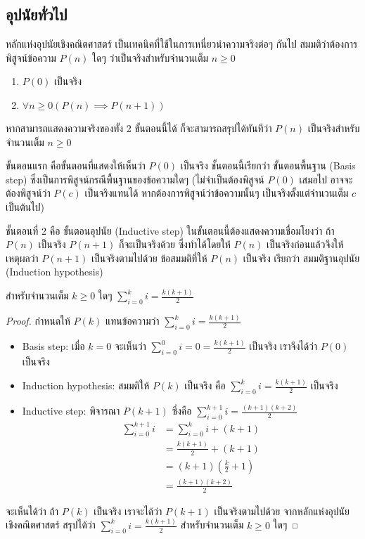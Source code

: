 \subsection{อุปนัยทั่วไป}

หลักแห่งอุปนัยเชิงคณิตศาสตร์ เป็นเทคนิคที่ใช้ในการเหนี่ยวนำความจริงต่อๆ กันไป สมมติว่าต้องการพิสูจน์ข้อความ $P(n)$ ใดๆ ว่าเป็นจริงสำหรับจำนวนเต็ม $n \geq 0$
\begin{enumerate}
\item $P(0)$ เป็นจริง
\item $\forall n \geq 0 (P(n) \implies P(n+1))$
\end{enumerate}

หากสามารถแสดงความจริงของทั้ง 2 ขั้นตอนนี้ได้ ก็จะสามารถสรุปได้ทันทีว่า $P(n)$ เป็นจริงสำหรับจำนวนเต็ม $n \geq 0$

ขั้นตอนแรก คือขั้นตอนที่แสดงให้เห็นว่า $P(0)$ เป็นจริง ชั้นตอนนี้เรียกว่า ขั้นตอนพื้นฐาน (Basis step) ซึ่งเป็นการพิสูจน์กรณีพื้นฐานของข้อความใดๆ (ไม่จำเป็นต้องพิสูจน์ $P(0)$ เสมอไป อาจจะต้องพิสูจน์ว่า $P(c)$ เป็นจริงแทนได้ หากต้องการพิสูจน์ว่าข้อความนั้นๆ เป็นจริงตั้งแต่จำนวนเต็ม $c$ เป็นต้นไป)

ชั้นตอนที่ 2 คือ ขั้นตอนอุปนัย (Inductive step) ในขั้นตอนนี้ต้องแสดงความเชื่อมโยงว่า ถ้า $P(n)$ เป็นจริง $P(n+1)$ ก็จะเป็นจริงด้วย ซึ่งทำได้โดยให้ $P(n)$ เป็นจริงก่อนแล้วจึงให้เหตุผลว่า $P(n+1)$ เป็นจริงตามไปด้วย ข้อสมมติที่ให้ $P(n)$  เป็นจริง เรียกว่า สมมติฐานอุปนัย (Induction hypothesis)

\begin{theorem}
สำหรับจำนวนเต็ม $k \geq 0$ ใดๆ $\sum_{i=0}^k i = \frac{k(k+1)}{2}$
\end{theorem}
\begin{proof}
กำหนดให้ $P(k)$ แทนข้อความว่า $\sum_{i=0}^k i = \frac{k(k+1)}{2}$
\begin{itemize}
\item Basis step: เมื่อ $k=0$ จะเห็นว่า $\sum_{i=0}^0 i = 0 = \frac{k(k+1)}{2}$ เป็นจริง เราจึงได้ว่า $P(0)$  เป็นจริง
\item Induction hypothesis: สมมติให้ $P(k)$ เป็นจริง คือ $\sum_{i=0}^k i = \frac{k(k+1)}{2}$ เป็นจริง
\item Inductive step: พิจารณา $P(k+1)$ ซึ่งคือ $\sum_{i=0}^{k+1} i = \frac{(k+1)(k+2)}{2}$
\begin{align*}
\sum_{i=0}^{k+1} i &= \sum_{i=0}^{k} i + (k+1) \\
&= \frac{k(k+1)}{2} + (k+1) \\
&= (k+1)(\frac{k}{2} + 1) \\
&=\frac{(k+1)(k+2)}{2}
\end{align*}
\end{itemize}

จะเห็นได้ว่า ถ้า $P(k)$ เป็นจริง เราจะได้ว่า $P(k+1)$ เป็นจริงตามไปด้วย จากหลักแห่งอุปนัยเชิงคณิตศาสตร์ สรุปได้ว่า $\sum_{i=0}^k i = \frac{k(k+1)}{2}$ สำหรับจำนวนเต็ม $k \geq 0$ ใดๆ
\end{proof}

